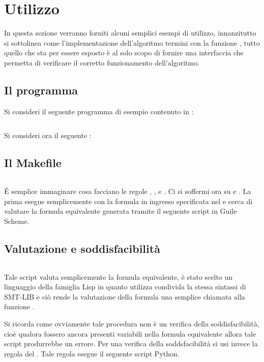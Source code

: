 \documentclass[11pt,letterpaper,twoside]{article}
\begin{document}
\newpage
\section{Utilizzo}

In questa sezione verranno forniti alcuni semplici esempi di utilizzo,
innanzitutto si sottolinea come l'implementazione dell'algoritmo termini con la
funzione , tutto quello che sta per essere esposto è al solo
scopo di fornire una interfaccia che permetta di verificare il corretto
funzionamento dell'algoritmo.

\subsection{Il programma }
Si consideri il seguente programma di esempio contenuto in :

\inputminted[linenos, mathescape=true]{C}{../test.c}

Si consideri ora il seguente :

\subsection{Il Makefile}
\inputminted[linenos]{makefile}{../makefile}

\'E semplice immaginare cosa facciano le regole , ,
 e . Ci si soffermi ora su  e
. La prima esegue semplicemente  con la formula in
ingresso specificata nel  e cerca di valutare la formula
equivalente generata tramite il seguente script in Guile Scheme\autocite{guile}.

\subsection{Valutazione e soddisfacibilità}
\inputminted[linenos]{scheme}{../eval.scm}

Tale script valuta semplicemente la formula equivalente, è stato scelto un
linguaggio della famiglia Lisp in quanto utilizza condivida la stessa sintassi
di SMT-LIB e ciò rende la valutazione della formula una semplice chiamata alla
funzione .

Si ricorda come ovviamente tale procedura non è un verifica della
soddisfacibilità, cioè qualora fossero ancora presenti variabili nella formula
equivalente allora tale script produrrebbe un errore. Per una verifica della
soddsfacibilità si usi invece la regola  del .
Tale regola esegue il seguente script Python\autocite{python}.
\end{document}
